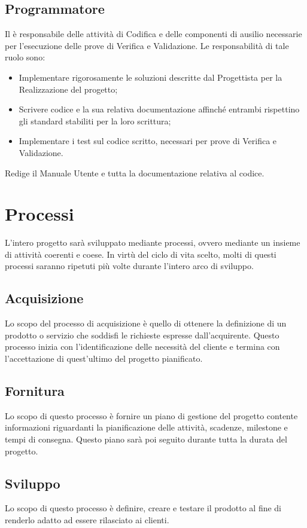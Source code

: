 \subsection{Programmatore}

Il  è responsabile delle attività di Codifica e delle componenti di ausilio
necessarie per l'esecuzione delle prove di Verifica e Validazione. Le responsabilità di tale ruolo sono:
\begin{itemize}
\item Implementare rigorosamente le soluzioni descritte dal Progettista per la Realizzazione del progetto;
\item Scrivere codice e la sua relativa documentazione affinché entrambi rispettino gli standard stabiliti per la loro scrittura;
\item Implementare i test sul codice scritto, necessari per prove di Verifica e Validazione.
\end{itemize}
Redige il Manuale Utente e tutta la documentazione relativa al codice.

\newpage
\section{Processi}
L'intero progetto sarà sviluppato mediante processi, ovvero mediante un insieme di attività coerenti e coese.
In virtù del ciclo di vita scelto, molti di questi processi saranno ripetuti più volte durante l'intero arco di sviluppo.

\subsection{Acquisizione}
Lo scopo del processo di acquisizione è quello di ottenere la definizione di un prodotto o servizio che soddisfi le richieste espresse dall'acquirente.
Questo processo inizia con l'identificazione delle necessità del cliente e termina con l'accettazione di quest'ultimo del progetto pianificato.

\subsection{Fornitura}
Lo scopo di questo processo è fornire un piano di gestione del progetto contente informazioni riguardanti la pianificazione delle attività, scadenze, milestone e tempi di consegna. Questo piano sarà poi seguito durante tutta la durata del progetto.
\subsection{Sviluppo}
Lo scopo di questo processo è definire, creare e testare il prodotto al fine di renderlo adatto ad essere rilasciato ai clienti.



